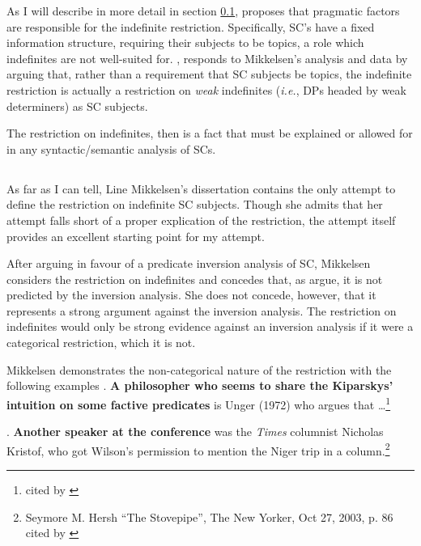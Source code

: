 \documentclass[GPFinal]{subfiles}
\begin{document}
As I will describe in more detail in section \ref{sec:Mikkelsen}, \textcite{mikkelsen2004specifying} proposes that pragmatic factors are responsible for the indefinite restriction.
Specifically, SC's have a fixed information structure, requiring their subjects to be topics, a role which indefinites are not well-suited for.
\textcite{heycock2012specification}, responds to Mikkelsen's analysis and data  by arguing that, rather than a requirement that SC subjects be topics, the indefinite restriction is actually a restriction on \textit{weak} indefinites (\textit{i.e.}, DPs headed by weak determiners) as SC subjects.

The restriction on indefinites, then is a fact that must be explained or allowed for in any syntactic/semantic analysis of SCs.

\subsection{\textcite{mikkelsen2004specifying}}\label{sec:Mikkelsen}
As far as I can tell, Line Mikkelsen's dissertation contains the only attempt to define the restriction on indefinite SC subjects.
Though she admits that her attempt falls short of a proper explication of the restriction, the attempt itself provides an excellent starting point for my attempt.

After arguing in favour of a predicate inversion analysis of SC, Mikkelsen considers the restriction on indefinites and concedes that, as \textcite{heycockkroch1999pseudocleft} argue, it is not predicted by the inversion analysis.
She does not concede, however, that it represents a strong argument against the inversion analysis.
The restriction on indefinites would only be strong evidence against an inversion analysis if it were a categorical restriction, which it is not.

Mikkelsen demonstrates the non-categorical nature of the restriction with the following examples
\ex.\label{ex:MikkPhilosopher} \textbf{A philosopher who seems to share the Kiparskys' intuition on some factive predicates} is Unger (1972) who argues that \dots\footnote{\textcite[][p. 195 fn8]{delacruz1976factives} cited by \textcite{mikkelsen2004specifying}}

\ex.\label{ex:MikkSpeaker} \textbf{Another speaker at the conference} was the \textit{Times} columnist Nicholas Kristof, who got Wilson's permission to mention the Niger trip in a column.\footnote{Seymore M. Hersh ``The Stovepipe'', The New Yorker, Oct 27, 2003, p. 86 cited by \textcite{mikkelsen2004specifying}}
\end{document}
